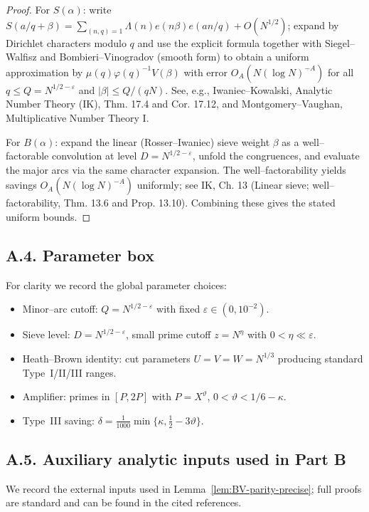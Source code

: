 \documentclass[11pt]{article}
\theoremstyle{definition}
\theoremstyle{remark}
\begin{document}
\begin{proof}
	For $S(\alpha)$: write $S(a/q+\beta)=\sum_{(n,q)=1}\Lambda(n)e(n\beta)e(an/q)+O(N^{1/2})$; expand by Dirichlet characters modulo $q$ and use the explicit formula together with Siegel--Walfisz and Bombieri--Vinogradov (smooth form) to obtain a uniform approximation by $\mu(q)\varphi(q)^{-1}V(\beta)$ with error $O_A(N(\log N)^{-A})$ for all $q\le Q=N^{1/2-\varepsilon}$ and $|\beta|\le Q/(qN)$. See, e.g., Iwaniec--Kowalski, Analytic Number Theory (IK), Thm. 17.4 and Cor. 17.12, and Montgomery--Vaughan, Multiplicative Number Theory I.

	For $B(\alpha)$: expand the linear (Rosser--Iwaniec) sieve weight $\beta$ as a well--factorable convolution at level $D=N^{1/2-\varepsilon}$, unfold the congruences, and evaluate the major arcs via the same character expansion. The well--factorability yields savings $O_A(N(\log N)^{-A})$ uniformly; see IK, Ch. 13 (Linear sieve; well--factorability, Thm. 13.6 and Prop. 13.10). Combining these gives the stated uniform bounds.
\end{proof}

\subsection*{A.4. Parameter box}

For clarity we record the global parameter choices:
\begin{itemize}
	\item Minor--arc cutoff: $Q=N^{1/2-\varepsilon}$ with fixed $\varepsilon\in(0,10^{-2})$.
	\item Sieve level: $D=N^{1/2-\varepsilon}$, small prime cutoff $z=N^\eta$ with $0<\eta\ll\varepsilon$.
	\item Heath--Brown identity: cut parameters $U=V=W=N^{1/3}$ producing standard Type~I/II/III ranges.
	\item Amplifier: primes in $[P,2P]$ with $P=X^\vartheta$, $0<\vartheta<1/6-\kappa$.
	\item Type~III saving: $\delta=\tfrac{1}{1000}\min\{\kappa,\tfrac12-3\vartheta\}$.
\end{itemize}
\subsection*{A.5. Auxiliary analytic inputs used in Part B}

We record the external inputs used in Lemma~\ref{lem:BV-parity-precise}; full proofs are standard and can be found in the cited references.
\end{document}

